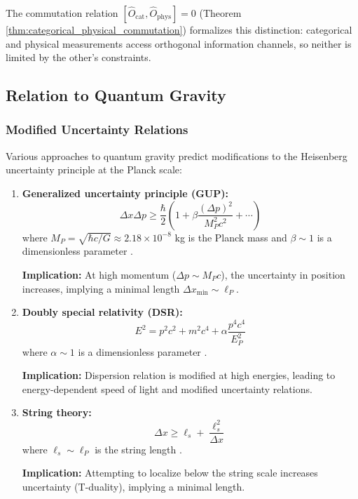 \documentclass[twocolumn,10pt]{article}
\theoremstyle{remark}
\begin{document}
The commutation relation $[\hat{O}_{\text{cat}}, \hat{O}_{\text{phys}}] = 0$ (Theorem \ref{thm:categorical_physical_commutation}) formalizes this distinction: categorical and physical measurements access orthogonal information channels, so neither is limited by the other's constraints.

\subsection{Relation to Quantum Gravity}

\subsubsection{Modified Uncertainty Relations}

Various approaches to quantum gravity predict modifications to the Heisenberg uncertainty principle at the Planck scale:

\begin{enumerate}
    \item \textbf{Generalized uncertainty principle (GUP):}
    \begin{equation}
        \Delta x \Delta p \geq \frac{\hbar}{2}\left(1 + \beta \frac{(\Delta p)^2}{M_P^2 c^2} + \cdots\right)
        \label{eq:GUP}
    \end{equation}
    where $M_P = \sqrt{\hbar c/G} \approx 2.18 \times 10^{-8}$ kg is the Planck mass and $\beta \sim 1$ is a dimensionless parameter \cite{Maggiore1993,Kempf1995}.

    \textbf{Implication:} At high momentum ($\Delta p \sim M_P c$), the uncertainty in position increases, implying a minimal length $\Delta x_{\min} \sim \ell_P$.

    \item \textbf{Doubly special relativity (DSR):}
    \begin{equation}
        E^2 = p^2 c^2 + m^2 c^4 + \alpha \frac{p^4 c^4}{E_P^2}
        \label{eq:DSR}
    \end{equation}
    where $\alpha \sim 1$ is a dimensionless parameter \cite{AmelinoCamelia2002}.

    \textbf{Implication:} Dispersion relation is modified at high energies, leading to energy-dependent speed of light and modified uncertainty relations.

    \item \textbf{String theory:}
    \begin{equation}
        \Delta x \geq \ell_s + \frac{\ell_s^2}{\Delta x}
        \label{eq:string_uncertainty}
    \end{equation}
    where $\ell_s \sim \ell_P$ is the string length \cite{Witten1996}.

    \textbf{Implication:} Attempting to localize below the string scale increases uncertainty (T-duality), implying a minimal length.
\end{enumerate}
\end{document}
